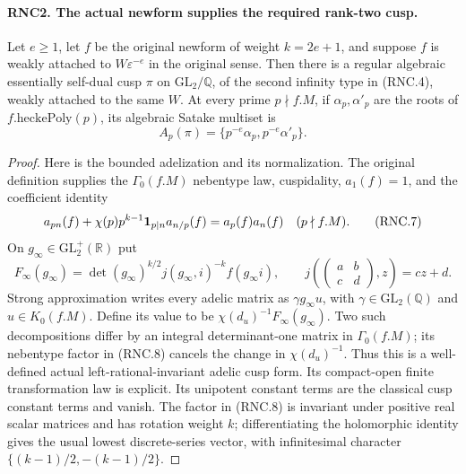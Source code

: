 \paragraph{RNC2. The actual newform supplies the required rank-two cusp.}
\label{claim:RNC2}
Let $e\geq1$, let $f$ be the original newform of weight
$k=2e+1$, and suppose $f$ is weakly attached to
$W\varepsilon^{-e}$ in the original sense.  Then there is a
regular algebraic essentially self-dual cusp $\pi$ on
$\mathrm{GL}_2/\mathbb Q$, of the second infinity type in
(RNC.4), weakly attached to the same $W$.  At every prime
$p\nmid f.M$, if $\alpha_p,\alpha'_p$ are the roots of
$f.\mathrm{heckePoly}(p)$, its algebraic Satake multiset is
\[
           A_p(\pi)=\{p^{-e}\alpha_p,p^{-e}\alpha'_p\}.
                                                               \tag{RNC.6}
\]
\begin{proof}
Here is the bounded adelization and its normalization.  The
original definition supplies the $\Gamma_0(f.M)$ nebentype law,
cuspidality, $a_1(f)=1$, and the coefficient identity
\[
 a_{pn}(f)+\chi(p)p^{k-1}{\bf1}_{p\mid n}a_{n/p}(f)
                         =a_p(f)a_n(f)\quad(p\nmid f.M).
                                                               \tag{RNC.7}
\]
On $g_\infty\in\mathrm{GL}_2^+(\mathbb R)$ put
\[
 F_\infty(g_\infty)=\det(g_\infty)^{k/2}
               j(g_\infty,i)^{-k}f(g_\infty i),
 \qquad j\!\left(\begin{pmatrix}a&b\\c&d\end{pmatrix},z\right)
                     =cz+d.
                                                               \tag{RNC.8}
\]
Strong approximation writes every adelic matrix as
$\gamma g_\infty u$, with $\gamma\in\mathrm{GL}_2(\mathbb Q)$
and $u\in K_0(f.M)$.  Define its value to be
$\chi(d_u)^{-1}F_\infty(g_\infty)$.  Two such decompositions
differ by an integral determinant-one matrix in
$\Gamma_0(f.M)$; its nebentype factor in (RNC.8) cancels the
change in $\chi(d_u)^{-1}$.  Thus this is a well-defined actual
left-rational-invariant adelic cusp form.  Its compact-open
finite transformation law is explicit.  Its unipotent constant
terms are the classical cusp constant terms and vanish.
The factor in (RNC.8) is invariant under positive real scalar
matrices and has rotation weight $k$; differentiating the
holomorphic identity gives the usual lowest discrete-series
vector, with infinitesimal character
$\{(k-1)/2,-(k-1)/2\}$.


\end{proof}
